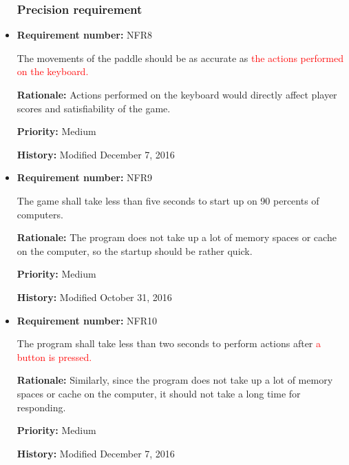 \documentclass[12pt,letterpaper]{article}
\begin{document}
\begin{reqbox}
	\begin{itemize}

\subsubsection{Precision requirement}

\item \textbf{Requirement number: }NFR8

		The movements of the paddle should be as accurate as \textcolor{red}{the actions performed on the keyboard.}

		\textbf{Rationale: } Actions performed on the keyboard would directly affect player scores and satisfiability of the game.

		\textbf{Priority: }Medium

		\textbf{History: }Modified December 7, 2016

	\end{itemize}
\end{reqbox}

\begin{reqbox}
	\begin{itemize}

\subsubsection{Reliability and availability requirement}

\item \textbf{Requirement number: }NFR9

		The game shall take less than five seconds to start up on 90 percents of computers.

		\textbf{Rationale: } The program does not take up a lot of memory spaces or cache on the computer, so the startup should be rather quick.

		\textbf{Priority: }Medium

		\textbf{History: }Modified October 31, 2016

		\item \textbf{Requirement number: }NFR10	
		
		The program shall take less than two seconds to perform actions after \textcolor{red}{a button is pressed.} 

		\textbf{Rationale: } Similarly, since the program does not take up a lot of memory spaces or cache on the computer, it should not take a long time for responding.

		\textbf{Priority: }Medium

		\textbf{History: }Modified December 7, 2016

	\end{itemize}
\end{reqbox}
\end{document}
